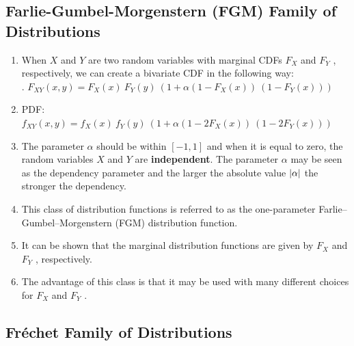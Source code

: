 \subsection{Farlie-Gumbel-Morgenstern (FGM) Family of Distributions}

\begin{enumerate}
    \item When $X$ and $Y$ are two random variables with marginal CDFs $F_X$ and $F_Y$ , respectively, we can create a bivariate CDF in the following way:
    \hfill \cite{statistics/book/Statistics-for-Data-Scientists/Maurits-Kaptein}
    \\[0.3cm]
    .\hfill
    $
        F _{X Y} (x, y) = F_X (x)\ F_Y (y)\ (1 + \alpha(1 - F_X (x))\ (1 - F_Y (x)))
    $
    \hfill \cite{statistics/book/Statistics-for-Data-Scientists/Maurits-Kaptein}

    \item PDF:
    $
        f _{X Y} (x, y) = f_X (x)\ f_Y (y)\ (1 + \alpha(1 - 2F_X (x))\ (1 - 2F_Y (x)))
    $
    \hfill \cite{statistics/book/Statistics-for-Data-Scientists/Maurits-Kaptein}

    \item The parameter $\alpha$ should be within $[-1, 1]$ and when it is equal to zero, the random variables $X$ and $Y$ are \textbf{independent}.
    The parameter $\alpha$ may be seen as the dependency parameter and the larger the absolute value $\left| \alpha \right|$ the stronger the dependency.
    \hfill \cite{statistics/book/Statistics-for-Data-Scientists/Maurits-Kaptein}

    \item This class of distribution functions is referred to as the one-parameter Farlie–Gumbel–Morgenstern (FGM) distribution function.
    \hfill \cite{statistics/book/Statistics-for-Data-Scientists/Maurits-Kaptein}

    \item It can be shown that the marginal distribution functions are given by $F_X$ and $F_Y$ , respectively.
    \hfill \cite{statistics/book/Statistics-for-Data-Scientists/Maurits-Kaptein}

    \item The advantage of this class is that it may be used with many different choices for $F_X$ and $F_Y$ .
    \hfill \cite{statistics/book/Statistics-for-Data-Scientists/Maurits-Kaptein}
\end{enumerate}



\subsection{Fréchet Family of Distributions}

